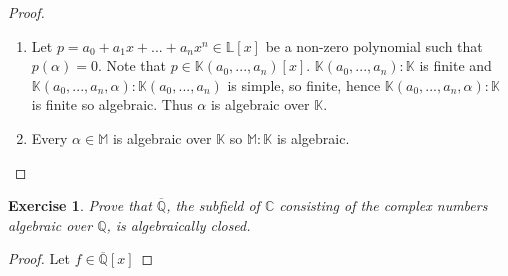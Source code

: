 \documentclass{article}
\newtheorem{exercise}[theorem]{Exercise}
\begin{document}
\begin{proof}
\begin{enumerate}[label=(\roman*)]
    \item Let $p=a_0+a_1x+...+a_nx^n\in\mathbb{L}[x]$ be a non-zero polynomial such that $p(\alpha)=0$. Note that $p\in \mathbb{K}(a_0,...,a_n)[x]$. $\mathbb{K}(a_0,...,a_n):\mathbb{K}$ is finite and $\mathbb{K}(a_0,...,a_n,\alpha):\mathbb{K}(a_0,...,a_n)$ is simple, so finite, hence $\mathbb{K}(a_0,...,a_n,\alpha):\mathbb{K}$ is finite so algebraic. Thus $\alpha$ is algebraic over $\mathbb{K}$.
    \item Every $\alpha\in \mathbb{M}$ is algebraic over $\mathbb{K}$ so $\mathbb{M}:\mathbb{K}$ is algebraic.
\end{enumerate}
\end{proof}

\begin{exercise}
Prove that $\overline{\mathbb{Q}}$, the subfield of $\mathbb{C}$ consisting of the complex numbers algebraic over $\mathbb{Q}$, is algebraically closed.
\end{exercise}
\begin{proof}
Let $f\in \overline{\mathbb{Q}}[x]$
\end{proof}
\end{document}
